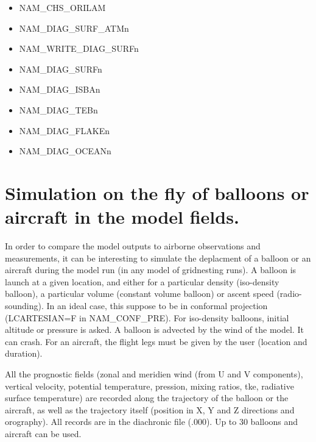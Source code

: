 \begin{itemize}
\item NAM\_CHS\_ORILAM
\item NAM\_DIAG\_SURF\_ATMn
\item NAM\_WRITE\_DIAG\_SURFn
\item NAM\_DIAG\_SURFn
\item NAM\_DIAG\_ISBAn
\item NAM\_DIAG\_TEBn
\item NAM\_DIAG\_FLAKEn
\item NAM\_DIAG\_OCEANn
\end{itemize}






\section{Simulation on the fly of balloons or aircraft in the model fields.}
\label{ss:balloon}

In order to compare the model outputs to airborne observations
and measurements, it can be interesting to simulate the deplacment of a
balloon or an aircraft during the model run (in any model of
gridnesting runs). A balloon is launch at
a given location, and either for a particular density (iso-density balloon),
a particular volume (constant volume balloon)
or ascent speed (radio-sounding). In an ideal case, this suppose to be in conformal projection 
(LCARTESIAN=F in NAM\_CONF\_PRE).
For iso-density balloons, initial 
altitude or pressure is asked. A balloon is advected by the wind of the
model. It can crash. For an aircraft, the flight
legs must be given by the user (location and duration). 

All the prognostic fields (zonal and meridien wind
(from U and V components), vertical velocity, potential temperature, pression,
mixing ratios, tke, radiative surface temperature)
are recorded along the trajectory
of the balloon or the aircraft, as well as the trajectory itself (position in
X, Y and Z directions and orography).
All records are in the diachronic file (.000). Up to 30 balloons and aircraft
can be used.

